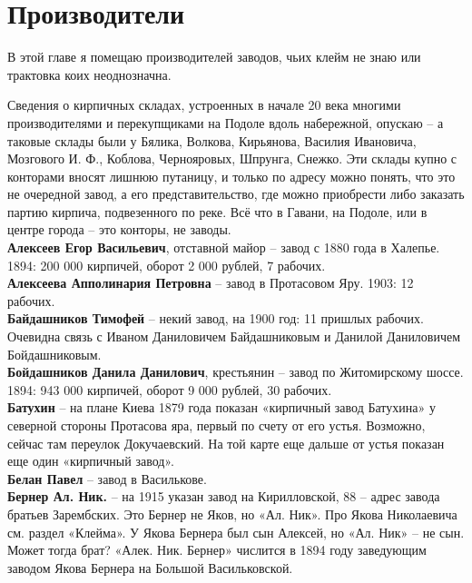 \chapter{Производители}

В этой главе я помещаю производителей заводов, чьих клейм не знаю или трактовка коих неоднозначна. 

Сведения о кирпичных складах, устроенных в начале 20 века многими производителями и перекупщиками на Подоле вдоль набережной, опускаю – а таковые склады были у Бялика, Волкова, Кирьянова, Василия Ивановича, Мозгового И. Ф., Коблова, Чернояровых, Шпрунга, Снежко. Эти склады купно с конторами вносят лишнюю путаницу, и только по адресу можно понять, что это не очередной завод, а его представительство, где можно приобрести либо заказать партию кирпича, подвезенного по реке. Всё что в Гавани, на Подоле, или в центре города – это конторы, не заводы.\\

\noindent\textbf{Алексеев Егор Васильевич}, отставной майор – завод с 1880 года в Халепье. 1894: 200 000 кирпичей, оборот 2 000 рублей, 7 рабочих.\\

\noindent\textbf{Алексеева Апполинария Петровна} – завод в Протасовом Яру. 1903: 12 рабочих.\\

\noindent\textbf{Байдашников Тимофей} – некий завод, на 1900 год: 11 пришлых рабочих. Очевидна связь с Иваном Даниловичем Байдашниковым и Данилой Даниловичем Бойдашниковым.\\

\noindent\textbf{Бойдашников Данила Данилович}, крестьянин – завод по Житомирскому шоссе. 1894: 943 000 кирпичей, оборот 9 000 рублей, 30 рабочих.\\

\noindent\textbf{Батухин} – на плане Киева 1879 года показан «кирпичный завод Батухина» у северной стороны Протасова яра, первый по счету от его устья. Возможно, сейчас там переулок Докучаевский. На той карте еще дальше от устья показан еще один «кирпичный завод».\\


\noindent\textbf{Белан Павел} – завод в Василькове.\\

\noindent\textbf{Бернер Ал. Ник.} – на 1915 указан завод на Кирилловской, 88 – адрес завода братьев Зарембских. Это Бернер не Яков, но «Ал. Ник». Про Якова Николаевича см. раздел «Клейма». У Якова Бернера был сын Алексей, но «Ал. Ник» – не сын. Может тогда брат? «Алек. Ник. Бернер» числится в 1894 году заведующим заводом Якова Бернера на Большой Васильковской.\\

